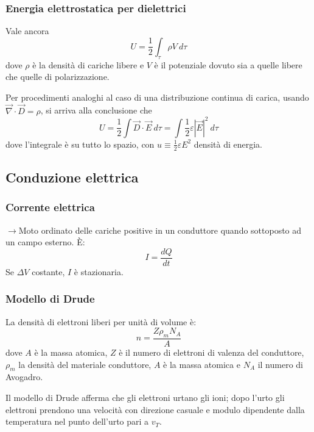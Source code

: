 \documentclass[a4paper]{scrartcl}
\numberwithin{equation}{subsection}
\theoremstyle{style1}
\begin{document}
\subsubsection{Energia elettrostatica per dielettrici}
Vale ancora 
\begin{equation}
	U = \frac{1}{2}\int_{\tau }  \rho  V \ d\tau 
\end{equation}
dove $\rho $ \`e la densit\`a di cariche libere e $V$ \`e il potenziale dovuto sia a quelle libere che quelle di polarizzazione.

Per procedimenti analoghi al caso di una distribuzione continua di carica, usando $\vec{\nabla }\cdot \vec{D} = \rho $, si arriva alla conclusione che
\begin{equation}
	U = \frac{1}{2}\int \vec{D} \cdot  \vec{E} \ d\tau = \int \frac{1}{2}\varepsilon  |\vec{E} |^2 \ d\tau 
\end{equation}
dove l'integrale \`e su tutto lo spazio, con $u\equiv \frac{1}{2}\varepsilon  E^2$ densit\`a di energia.


\subsection{Conduzione elettrica}
\subsubsection{Corrente elettrica}
$\to$Moto ordinato delle cariche positive in un conduttore quando sottoposto ad un campo esterno. \`E:
\begin{equation}
	I = \frac{dQ}{dt}
\end{equation}
Se $\Delta V$ costante, $I$ \`e stazionaria.
\subsubsection{Modello di Drude}

La densit\`a di elettroni liberi per unit\`a di volume \`e:
\begin{equation}
	n = \frac{Z \rho _m N_A}{A}
\end{equation}
dove $A$ \`e la massa atomica, $Z$ \`e il numero di elettroni di valenza del conduttore, $\rho _m$ la densit\`a del materiale conduttore, $A$ \`e la massa atomica e $N_A$ il numero di Avogadro.

Il modello di Drude afferma che gli elettroni urtano gli ioni; dopo l'urto gli elettroni prendono una velocit\`a con direzione casuale e modulo dipendente dalla temperatura nel punto dell'urto pari a $v_T$.
\end{document}
